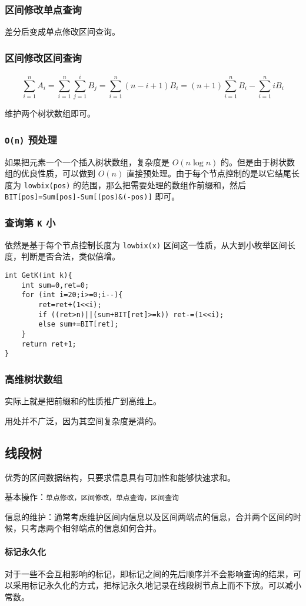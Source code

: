 \documentclass[UTF-8]{ctexart}
\begin{document}
	\subsubsection{区间修改单点查询}
	差分后变成单点修改区间查询。
	\subsubsection{区间修改区间查询}
	$$\sum_{i=1}^{n} A_i=\sum_{i=1}^n \sum_{j=1}^i B_j=\sum_{i=1}^n (n-i+1)B_i=(n+1)\sum_{i=1}^n B_i-\sum_{i=1}^n iB_i$$
	
	维护两个树状数组即可。
	\subsubsection{ \texttt{O(n)} 预处理}
	如果把元素一个一个插入树状数组，复杂度是 $O(n\log n)$ 的。但是由于树状数组的优良性质，可以做到 $O(n)$ 直接预处理。由于每个节点控制的是以它结尾长度为 \texttt{lowbix(pos)} 的范围，那么把需要处理的数组作前缀和，然后 \texttt{BIT[pos]=Sum[pos]-Sum[(pos)\&(-pos)]} 即可。
	\subsubsection{查询第 \texttt{K} 小}
	依然是基于每个节点控制长度为 \texttt{lowbix(x)} 区间这一性质，从大到小枚举区间长度，判断是否合法，类似倍增。
\begin{verbatim}
int GetK(int k){
    int sum=0,ret=0;
    for (int i=20;i>=0;i--){
        ret=ret+(1<<i);
        if ((ret>n)||(sum+BIT[ret]>=k)) ret-=(1<<i);
        else sum+=BIT[ret];
    }
    return ret+1;
}
\end{verbatim}
	\subsubsection{高维树状数组}
	实际上就是把前缀和的性质推广到高维上。
	
	用处并不广泛，因为其空间复杂度是满的。
	\subsection{线段树}
	优秀的区间数据结构，只要求信息具有可加性和能够快速求和。
	
	基本操作：\texttt{单点修改，区间修改，单点查询，区间查询}
	
	信息的维护：通常考虑维护区间内信息以及区间两端点的信息，合并两个区间的时候，只考虑两个相邻端点的信息如何合并。
	
	\paragraph{标记永久化} 对于一些不会互相影响的标记，即标记之间的先后顺序并不会影响查询的结果，可以采用标记永久化的方式，把标记永久地记录在线段树节点上而不下放。可以减小常数。
	
\end{document}
